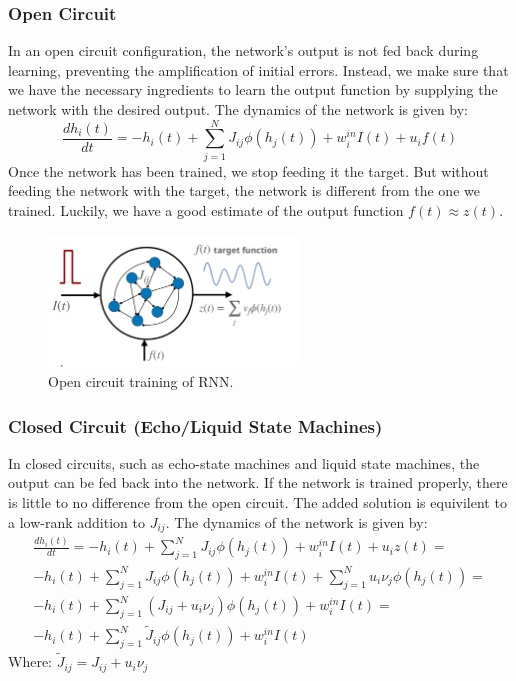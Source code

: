 \documentclass[11pt]{book} %
\begin{document}
\subsubsection{Open Circuit}
In an open circuit configuration, the network's output is not fed back during learning, preventing the amplification of initial errors. 
Instead, we make sure that we have the necessary ingredients to learn the output function by supplying the network with the desired output.
The dynamics of the network is given by:
\[
    \frac{dh_i(t)}{dt} = -h_i(t) + \sum_{j=1}^N J_{ij} \phi(h_j(t)) + w_i^{in} I(t) + u_i f(t)
\]
Once the network has been trained, we stop feeding it the target.
But without feeding the network with the target, the network is different from the one we trained.
Luckily, we have a good estimate of the output function $f(t) \approx z(t)$.

\begin{figure}[ht]
\centering
\includegraphics[width=0.6\textwidth]{Figs/RNN_open_circuit.jpeg}
\caption{Open circuit training of RNN.}
\label{fig:rnn_learning}
\end{figure}


\subsubsection{Closed Circuit (Echo/Liquid State Machines)}
In closed circuits, such as echo-state machines and liquid state machines, the output can be fed back into the network. 
If the network is trained properly, there is little to no difference from the open circuit.
The added solution is equivilent to a low-rank addition to $J_{ij}$.
The dynamics of the network is given by:
\begin{align*}
    \frac{dh_i(t)}{dt} = -h_i(t) + \sum_{j=1}^N J_{ij} \phi(h_j(t)) + w_i^{in} I(t) + u_i z(t) = \\
    -h_i(t) + \sum_{j=1}^N J_{ij} \phi(h_j(t)) + w_i^{in} I(t) + \sum_{j=1}^N u_i \nu_j \phi(h_j(t)) = \\
    -h_i(t) + \sum_{j=1}^N (J_{ij} + u_i \nu_j) \phi(h_j(t)) + w_i^{in} I(t) = \\
    -h_i(t) + \sum_{j=1}^N \tilde{J}_{ij} \phi(h_j(t)) + w_i^{in} I(t)
\end{align*}
Where: $\tilde{J}_{ij} = J_{ij} + u_i \nu_j$
\end{document}
